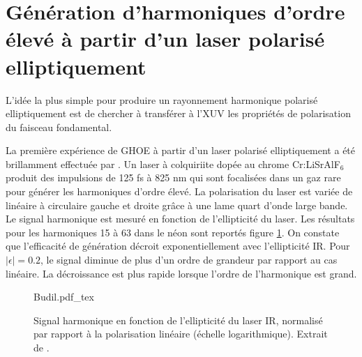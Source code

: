 \section{Génération d'harmoniques d'ordre élevé à partir d'un laser polarisé elliptiquement}
L'idée la plus simple pour produire un rayonnement harmonique polarisé elliptiquement est de chercher à transférer à l'XUV les propriétés de polarisation du faisceau fondamental.

La première expérience de GHOE à partir d'un laser polarisé elliptiquement a été brillamment effectuée par . Un laser à colquiriite dopée au chrome Cr:LiSrAlF$_6$ produit des impulsions de 125 fs à 825 nm qui sont focalisées dans un gaz rare pour générer les harmoniques d'ordre élevé. La polarisation du laser est variée  de linéaire à circulaire gauche et droite grâce à une lame quart d'onde large bande. Le signal harmonique est mesuré en fonction de l'ellipticité du laser. Les résultats pour les harmoniques 15 à 63 dans le néon sont reportés figure \ref{fig:Budil}. On constate que l'efficacité de génération décroit exponentiellement avec l'ellipticité IR. Pour $|\epsilon| = 0.2$, le signal diminue de plus d'un ordre de grandeur par rapport au cas linéaire. La décroissance est plus rapide lorsque l'ordre de l'harmonique est grand.

\begin{figure}
\centering
\def\svgwidth{0.8\textwidth}
{Budil.pdf_tex}
\caption{Signal harmonique en fonction de l'ellipticité du laser IR, normalisé par rapport à la polarisation linéaire (échelle logarithmique). Extrait de .}
\label{fig:Budil}
\end{figure}

